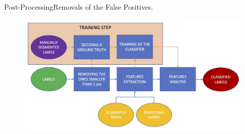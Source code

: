 \documentclass[]{standalone}
\begin{document}
	\begin{frame}{Post-Processing}{Removals of the False Positives.}
	\vspace{-20pt}
		\begin{figure}[h!]
			\includegraphics[width = \textwidth]{./IMG/FLOWCHART_POST.jpg}
		\end{figure}

	\end{frame}
\end{document}
